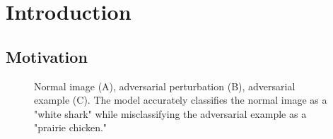 \chapter{Introduction}
\label{Introduction}

\section{Motivation}
\begin{figure}[!htb]
    \centering
    \caption{Normal image (A), adversarial perturbation (B), adversarial
        example (C). The model accurately classifies the normal image as a
        "white shark" while misclassifying the adversarial example as a "prairie
        chicken."}
    \label{fig:adversarial_examples}
\end{figure}

